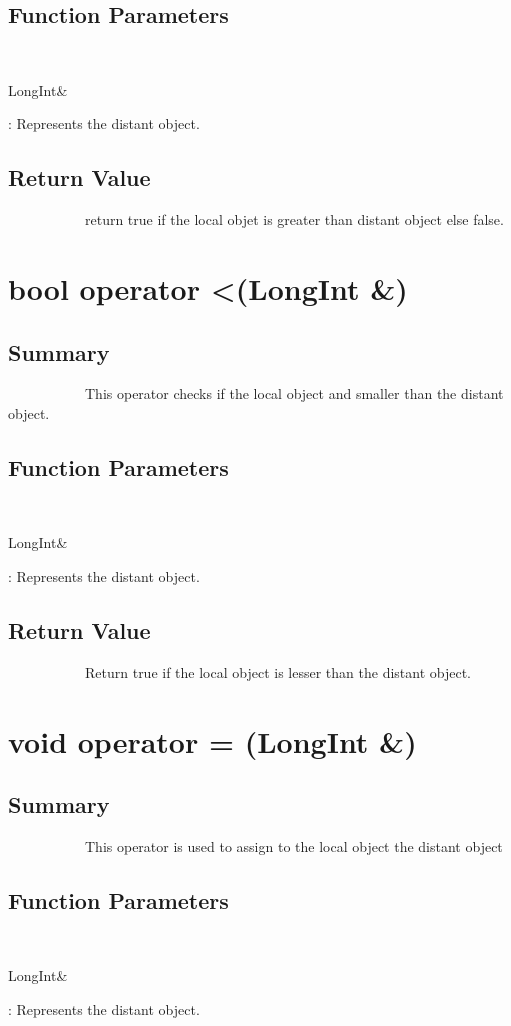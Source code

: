 \documentclass[11pt]{report}
\begin{document}
	\subsection{Function Parameters}
~~~~~~~~~~~\begin{bf}LongInt\&\end{bf}: Represents the distant object.

\subsection{Return Value}
~~~~~~~~~~~return true if the local objet is greater than distant object else false.


\section{ bool operator \textless (LongInt \&)}
	\subsection{Summary}
~~~~~~~~~~~This operator checks if the local object and smaller than the distant object.
	\subsection{Function Parameters}
~~~~~~~~~~~\begin{bf}LongInt\&\end{bf}: Represents the distant object.

\subsection{Return Value}
~~~~~~~~~~~Return true if the local object is lesser than the distant object.

\section{ void operator = (LongInt \&)}
	\subsection{Summary}
~~~~~~~~~~~This operator is used to assign to the local object the distant object
	\subsection{Function Parameters}
~~~~~~~~~~~\begin{bf}LongInt\&\end{bf}: Represents the distant object.
\end{document}
